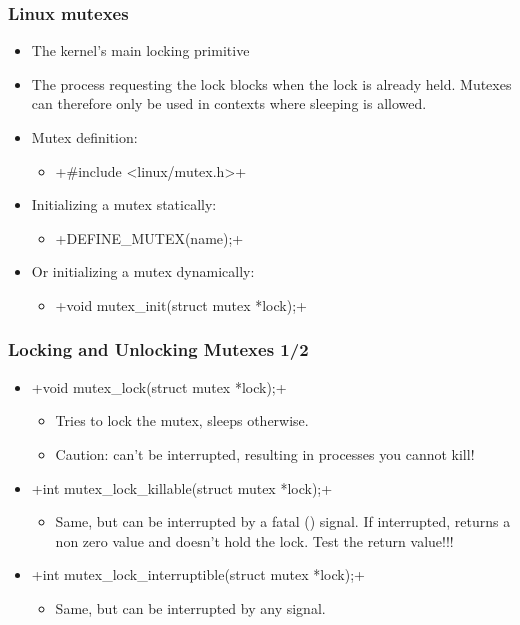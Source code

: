 \begin{frame}[fragile]
  \frametitle{Linux mutexes}
  \begin{itemize}
  \item The kernel's main locking primitive
  \item The process requesting the lock blocks when the lock is
    already held.  Mutexes can therefore only be used in contexts
    where sleeping is allowed.
  \item Mutex definition:
    \begin{itemize}
    \item {}+#include <linux/mutex.h>+
    \end{itemize}
  \item Initializing a mutex statically:
    \begin{itemize}
    \item {}+DEFINE_MUTEX(name);+
    \end{itemize}
  \item Or initializing a mutex dynamically:
    \begin{itemize}
    \item {}+void mutex_init(struct mutex *lock);+
    \end{itemize}
  \end{itemize}
\end{frame}

\begin{frame}[fragile]
  \frametitle{Locking and Unlocking Mutexes 1/2}
  \begin{itemize}
  \item {}+void mutex_lock(struct mutex *lock);+
    \begin{itemize}
    \item Tries to lock the mutex, sleeps otherwise.
    \item Caution: can't be interrupted, resulting in processes you
      cannot kill!
    \end{itemize}
  \item {}+int mutex_lock_killable(struct mutex *lock);+
    \begin{itemize}
    \item Same, but can be interrupted by a fatal () signal. If
      interrupted, returns a non zero value and doesn't hold the
      lock. Test the return value!!!
    \end{itemize}
  \item {}+int mutex_lock_interruptible(struct mutex *lock);+
    \begin{itemize}
    \item Same, but can be interrupted by any signal.
    \end{itemize}
  \end{itemize}
\end{frame}

